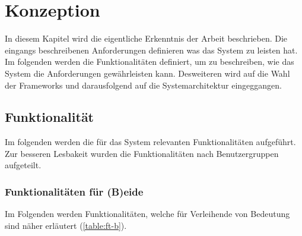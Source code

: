 \chapter{Konzeption}
\label{chapter-konzept}

In diesem Kapitel wird die eigentliche Erkenntnis der Arbeit beschrieben. Die
eingangs beschreibenen Anforderungen definieren was das System zu leisten hat.
Im folgenden werden die Funktionalitäten definiert, um zu beschreiben, wie das
System die Anforderungen gewährleisten kann. Desweiteren wird auf die Wahl der
Frameworks und darausfolgend auf die Systemarchitektur eingeggangen.

\section{Funktionalität}
\label{section:funktionalitaeten}
Im folgenden werden die für das System relevanten Funktionalitäten aufgeführt.
Zur besseren Lesbakeit wurden die Funktionalitäten nach Benutzergruppen
aufgeteilt.

\subsection{Funktionalitäten für (B)eide}
Im Folgenden werden Funktionalitäten, welche für Verleihende von Bedeutung sind
näher erläutert (\ref{table:ft-b}).

